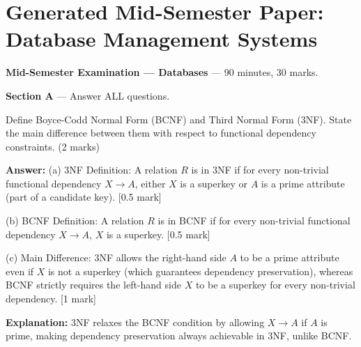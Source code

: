 \section{Generated Mid-Semester Paper: Database Management Systems}

\noindent\textbf{Mid-Semester Examination — Databases} --- 90 minutes, 30 marks.\par\medskip

\noindent\textbf{Section A} --- Answer ALL questions.\par\smallskip

\begin{tcolorbox}[enhanced,breakable,colback=boxgray,colframe=gray!45,boxrule=0.4pt,arc=2pt,left=6pt,right=6pt,top=4pt,bottom=4pt,title={Q.1},fonttitle=\bfseries\small,coltitle=black,colbacktitle=gray!15]
\small Define Boyce-Codd Normal Form (BCNF) and Third Normal Form (3NF). State the main difference between them with respect to functional dependency constraints. (2 marks)\par\par{}\par\smallskip\textbf{Answer:} (a) 3NF Definition: A relation $R$ is in 3NF if for every non-trivial functional dependency $X \rightarrow A$, either $X$ is a superkey or $A$ is a prime attribute (part of a candidate key). [0.5 mark]\par
(b) BCNF Definition: A relation $R$ is in BCNF if for every non-trivial functional dependency $X \rightarrow A$, $X$ is a superkey. [0.5 mark]\par
(c) Main Difference: 3NF allows the right-hand side $A$ to be a prime attribute even if $X$ is not a superkey (which guarantees dependency preservation), whereas BCNF strictly requires the left-hand side $X$ to be a superkey for every non-trivial dependency. [1 mark]\par\par\textbf{Explanation:} 3NF relaxes the BCNF condition by allowing $X \rightarrow A$ if $A$ is prime, making dependency preservation always achievable in 3NF, unlike BCNF.\par
\end{tcolorbox}


